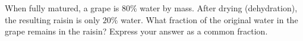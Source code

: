 When fully matured, a grape is $80\%$ water by mass. After drying (dehydration), the resulting raisin is only $20\%$ water. What fraction of the original water in the grape remains in the raisin? Express your answer as a common fraction.
